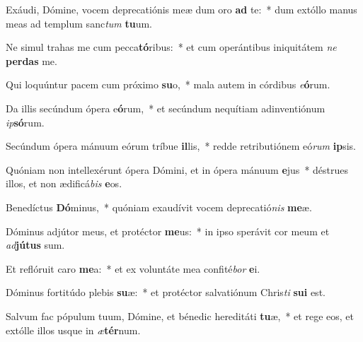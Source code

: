 \item Exáudi, Dómine, vocem deprecatiónis meæ dum oro \textbf{ad} te:~* dum extóllo manus meas ad templum sanc\textit{tum} \textbf{tu}um.
\item Ne simul trahas me cum pecca\textbf{tó}ribus:~* et cum operántibus iniquitátem \textit{ne} \textbf{per}\textbf{das} me.
\item Qui loquúntur pacem cum próximo \textbf{su}o,~* mala autem in córdibus \textit{e}\textbf{ó}rum.
\item Da illis secúndum ópera e\textbf{ó}rum,~* et secúndum nequítiam adinventiónum \textit{ip}\textbf{só}rum.
\item Secúndum ópera mánuum eórum tríbue \textbf{il}lis,~* redde retributiónem eó\textit{rum} \textbf{ip}sis.
\item Quóniam non intellexérunt ópera Dómini, et in ópera mánuum \textbf{e}jus~* déstrues illos, et non ædificá\textit{bis} \textbf{e}os.
\item Benedíctus \textbf{Dó}minus,~* quóniam exaudívit vocem deprecatió\textit{nis} \textbf{me}æ.
\item Dóminus adjútor meus, et protéctor \textbf{me}us:~* in ipso sperávit cor meum et \textit{ad}\textbf{jú}\textbf{tus} sum.
\item Et reflóruit caro \textbf{me}a:~* et ex voluntáte mea confité\textit{bor} \textbf{e}i.
\item Dóminus fortitúdo plebis \textbf{su}æ:~* et protéctor salvatiónum Chris\textit{ti} \textbf{su}\textbf{i} est.
\item Salvum fac pópulum tuum, Dómine, et bénedic hereditáti \textbf{tu}æ,~* et rege eos, et extólle illos usque in \textit{æ}\textbf{tér}num.
